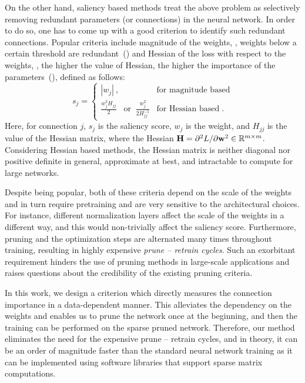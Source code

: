 On the other hand, saliency based methods treat the above problem as selectively removing redundant parameters (or connections) in the neural network.
In order to do so, one has to come up with a good criterion to identify such redundant connections.
Popular criteria include magnitude of the weights, \ie, weights below a certain threshold are redundant~(\cite{han2015learning,guo2016dynamic}) and Hessian of the loss with respect to the weights, \ie, the higher the value of Hessian, the higher the importance of the parameters~(\cite{lecun1990optimal,hassibi1993optimal}), defined as follows:
\begin{equation}
    s_j =
    \begin{cases}
    |w_j|\ , & \text{for magnitude based} \\[1ex]
    \frac{w^{2}_{j}H_{jj}}{2}\;\;\; \text{or}\;\; \frac{w^{2}_{j}}{2H^{-1}_{jj}}         & \text{for Hessian based}\;.
    \end{cases}
\end{equation}
Here, for connection $j$, $s_j$ is the saliency score, $w_j$ is the weight, and $H_{jj}$ is the value of the Hessian matrix, where the Hessian ${\mathbf{H}} = \partial^{2}L/\partial{\mathbf{w}}^{2} \in {\mathbb{R}}^{m \times m}$.
Considering Hessian based methods, the Hessian matrix is neither diagonal nor positive definite in general, approximate at best, and intractable to compute for large networks.

Despite being popular, both of these criteria depend on the scale of the weights and in turn require pretraining and are very sensitive to the architectural choices.
For instance, different normalization layers affect the scale of the weights in a different way, and this would non-trivially affect the saliency score.
Furthermore, pruning and the optimization steps are alternated many times throughout training, resulting in highly expensive {\em prune -- retrain cycles}.
Such an exorbitant requirement hinders the use of pruning methods in large-scale applications and raises questions about the credibility of the existing pruning criteria.

In this work, we design a criterion which directly measures the connection importance in a data-dependent manner.
This alleviates the dependency on the weights and enables us to prune the network once at the beginning, and then the training can be performed on the sparse pruned network.
Therefore, our method eliminates the need for the expensive prune -- retrain cycles, and in theory, it can be an order of magnitude faster than the standard neural network training as it can be implemented using software libraries that support sparse matrix computations.

